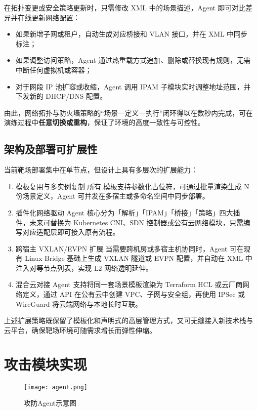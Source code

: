 \documentclass[lang=cn,10pt]{elegantbook}
\begin{document}
在拓扑变更或安全策略更新时，只需修改 XML 中的场景描述，Agent 即可对比差异并在线更新网络配置：  
\begin{itemize}
  \item 如果新增子网或租户，自动生成对应桥接和 VLAN 接口，并在 XML 中同步标注；  
  \item 如果调整访问策略，Agent 通过热重载方式追加、删除或替换现有规则，无需中断任何虚拟机或容器；  
  \item 对于网段 IP 池扩容或收缩，Agent 调用 IPAM 子模块实时调整地址范围，并下发新的 DHCP/DNS 配置。  
\end{itemize}

由此，网络拓扑与防火墙策略的“场景—定义—执行”闭环得以在数秒内完成，可在演练过程中\textbf{任意切换或重构}，保证了环境的高度一致性与可控性。


\subsection{架构及部署可扩展性}

当前靶场部署集中在单节点，但设计上具有多层次的扩展能力：

\begin{enumerate}
  \item 模板复用与多实例复制  
        所有  模板支持参数化占位符，可通过批量渲染生成 N 份场景定义，Agent 可并发在多宿主或多命名空间中同步部署。  
  \item 插件化网络驱动  
        Agent 核心分为「解析」「IPAM」「桥接」「策略」四大插件，未来可替换为 Kubernetes CNI、SDN 控制器或公有云网络模块，只需编写对应适配层即可接入原有流程。  
  \item 跨宿主 VXLAN/EVPN 扩展  
        当需要跨机房或多宿主机协同时，Agent 可在现有 Linux Bridge 基础上生成 VXLAN 隧道或 EVPN 配置，并自动在 XML 中注入对等节点列表，实现 L2 网络透明延伸。  
  \item 混合云对接  
        Agent 支持将同一套场景模板渲染为 Terraform HCL 或云厂商网络定义，通过 API 在公有云中创建 VPC、子网与安全组，再使用 IPSec 或 WireGuard 将云端网络与本地长时互联。  
\end{enumerate}

上述扩展策略既保留了模板化和声明式的高层管理方式，又可无缝接入新技术栈与云平台，确保靶场环境可随需求增长而弹性伸缩。

\section{攻击模块实现}

\begin{figure}[H]
\centering
\texttt{[image: agent.png]}  %
\caption{攻防Agent示意图}  %
\label{fig:agent}  %
\end{figure}
\end{document}
